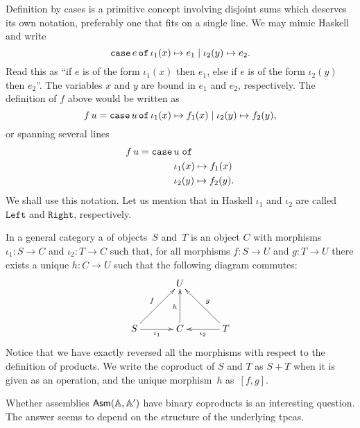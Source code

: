 Definition by cases is a primitive concept involving disjoint sums
which deserves its own notation, preferably one that fits on a single
line. We may mimic Haskell and write
%
\begin{equation*}
  \mathtt{case}\,e\,\mathtt{of}\,\iota_1(x) \mapsto e_1 \mid \iota_2(y) \mapsto e_2.
\end{equation*}
%
Read this as ``if $e$ is of the form $\iota_1(x)$ then $e_1$, else if
$e$ is of the form $\iota_2(y)$ then $e_2$''. The variables $x$ and
$y$ are bound in $e_1$ and $e_2$, respectively. The definition of $f$
above would be written as
%
\begin{equation*}
  f\,u = \mathtt{case}\,u\,\mathtt{of}\,\iota_1(x) \mapsto f_1(x) \mid \iota_2(y) \mapsto f_2(y),
\end{equation*}
%
or spanning several lines
%
\begin{equation*}
  f\,u = \begin{aligned}[t]\mathtt{case}\,&u\;\mathtt{of}\\&\iota_1(x) \mapsto f_1(x) \\&\iota_2(y) \mapsto f_2(y).\end{aligned}
\end{equation*}
%
We shall use this notation. Let us mention that in Haskell $\iota_1$
and $\iota_2$ are called $\mathtt{Left}$ and $\mathtt{Right}$,
respectively.

In a general category a  of objects~$S$
and~$T$ is an object $C$ with morphisms $\iota_1 : S \to C$ and
$\iota_2 : T \to C$ such that, for all morphisms $f : S \to U$ and $g
: T \to U$ there exists a unique $h : C \to U$ such that the following
diagram commutes:
%
\begin{equation*}
  \xymatrix@+1em{
    &
    {U}
    &
    \\
    {S}
    \ar[r]_{\iota_1}
    \ar[ru]^{f}
    &
    {C}
    \ar[u]^{h}
    &
    {T}
    \ar[l]^{\iota_2}
    \ar[lu]_{g}
  }
\end{equation*}
%
Notice that we have exactly reversed all the morphisms with respect to
the definition of products. We write the coproduct of $S$ and $T$ as
$S + T$ when it is given as an operation, and the unique morphism~$h$
as~$[f,g]$.

Whether assemblies $\mathsf{Asm}(\mathbb{A},\mathbb{A}')$ have binary coproducts is an interesting
question. The answer seems to depend on the structure of the
underlying tpcas.

